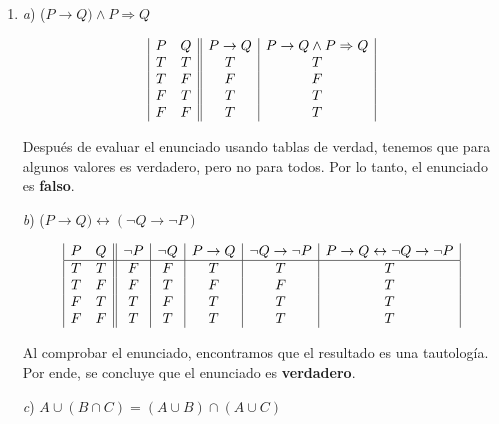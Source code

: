 \documentclass[11pt,a4paper]{article}
\begin{document}
\begin{enumerate}
\item 



\textit{a}) ($P\rightarrow Q) \wedge P \Rightarrow Q$


\begin{displaymath}
\begin{array}{|c c||c|c|}

P & Q & P \rightarrow Q & P\rightarrow Q \wedge P \Rightarrow Q \\ 
T & T & T & T\\
T & F & F & F\\
F & T & T & T\\
F & F & T & T\\
\end{array}
\end{displaymath}

\vspace{0.2cm}

\noindent Después de evaluar el enunciado usando tablas de verdad, tenemos que para algunos valores es verdadero, pero no para todos. Por lo tanto, el enunciado es \textbf{falso}. 
\vspace{0.5cm}

\textit{b}) ($P\rightarrow Q) \leftrightarrow (\neg  Q \rightarrow \neg P)$

\begin{displaymath}
\begin{array}{|c c||c|c|c|c|c|}
P & Q & \neg  P & \neg  Q & P\rightarrow Q & \neg  Q \rightarrow \neg P & P\rightarrow Q \leftrightarrow \neg  Q \rightarrow \neg P \\
\hline
T & T & F & F & T & T & T\\
T & F & F & T & F & F & T\\
F & T & T & F & T & T & T\\
F & F & T & T & T & T & T\\
\end{array}
\end{displaymath}

\noindent Al comprobar el enunciado, encontramos que el resultado es una tautología. Por ende, se concluye que el enunciado es \textbf{verdadero}.

\vspace{0.5cm}

\textit{c}) $ A \cup (B \cap C) = (A \cup B) \cap (A \cup C) $


\end{enumerate}
\end{document}
